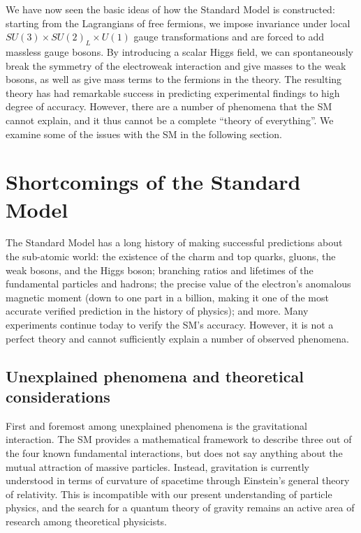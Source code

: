 We have now seen the basic ideas of how the Standard Model is constructed: starting from the Lagrangians
of free fermions, we impose invariance under local $SU(3)\times SU(2)_L\times U(1)$ gauge transformations
and are forced to add massless gauge bosons. By introducing a scalar Higgs field, we can spontaneously 
break the symmetry of the electroweak interaction and give masses to the weak bosons, as well as
give mass terms to the fermions in the theory. The resulting theory has had remarkable success in
predicting experimental findings to high degree of accuracy. However, there are a number of phenomena
that the SM cannot explain, and it thus cannot be a complete ``theory of everything''. We examine some
of the issues with the SM in the following section.


\section{Shortcomings of the Standard Model}
The Standard Model has a long history of making successful predictions about the sub-atomic
world: the existence of the charm and top quarks, gluons, the weak bosons, and the Higgs boson;
branching ratios and lifetimes of the fundamental particles and hadrons; the precise value of the
electron's anomalous magnetic moment (down to one part in a billion, making it one of the most accurate
verified prediction in the history of physics); and more. Many experiments continue today to verify the SM's
accuracy. However, it is not a perfect theory and cannot sufficiently explain a number of observed
phenomena.

\subsection{Unexplained phenomena and theoretical considerations}

First and foremost among unexplained phenomena is the gravitational interaction. 
The SM provides a mathematical framework to describe
three out of the four known fundamental interactions, but does not say anything about the mutual attraction
of massive particles. Instead, gravitation is currently understood in terms of curvature of spacetime
through Einstein's general theory of relativity. This is incompatible with our present understanding of
particle physics, and the search for a quantum theory of gravity remains an active area
of research among theoretical physicists.

